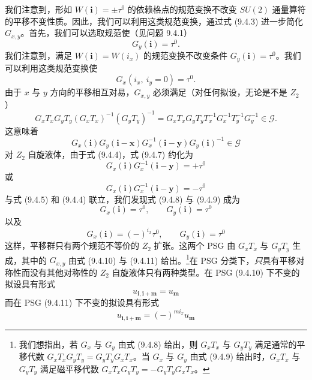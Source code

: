 我们注意到，形如 $W(\pmb{i})=\pm\tau^0$ 的依赖格点的规范变换不改变 $SU(2)$ 通量算符的平移不变性质。因此，我们可以利用这类规范变换，通过式 (9.4.3) 进一步简化 $G_{x,y}$。首先，我们可以选取规范使（见问题 9.4.1）
\begin{equation*}
G_y(\pmb{i})=\tau^0.
\tag{9.4.4}
\end{equation*}
我们注意到，满足 $W(\pmb{i})=W(i_x)$ 的规范变换不改变条件 $G_y(\pmb{i})=\tau^0$。我们可以利用这类规范变换使
\begin{equation*}
G_x(i_x,\ i_y=0)=\tau^0.
\tag{9.4.5}
\end{equation*}
由于 $x$ 与 $y$ 方向的平移相互对易，$G_{x,y}$ 必须满足（对任何拟设，无论是不是 $Z_2$）
\begin{equation*}
G_xT_xG_yT_y(G_xT_x)^{-1}(G_yT_y)^{-1}=G_xT_xG_yT_yT_x^{-1}G_x^{-1}T_y^{-1}G_y^{-1}\in\mathcal{G}.
\tag{9.4.6}
\end{equation*}
这意味着
\begin{equation*}
G_x(\pmb{i})G_y(\pmb{i}-\pmb{x})G_x^{-1}(\pmb{i}-\pmb{y})G_y(\pmb{i})^{-1}\in\mathcal{G}
\tag{9.4.7}
\end{equation*}
对 $Z_2$ 自旋液体，由于式 (9.4.4)，式 (9.4.7) 约化为
\begin{equation*}
G_x(\pmb{i})G_x^{-1}(\pmb{i}-\pmb{y})=+\tau^0
\tag{9.4.8}
\end{equation*}
或
\begin{equation*}
G_x(\pmb{i})G_x^{-1}(\pmb{i}-\pmb{y})=-\tau^0
\tag{9.4.9}
\end{equation*}
与式 (9.4.5) 和 (9.4.4) 联立，我们发现式 (9.4.8) 与 (9.4.9) 成为
\begin{equation*}
G_x(\pmb{i})=\tau^0,\qquad G_y(\pmb{i})=\tau^0
\tag{9.4.10}
\end{equation*}
以及
\begin{equation*}
G_x(\pmb{i})=(-)^{i_x}\tau^0,\qquad G_y(\pmb{i})=\tau^0
\tag{9.4.11}
\end{equation*}
这样，平移群只有两个规范不等价的 $Z_2$ 扩张。这两个 PSG 由 $G_xT_x$ 与 $G_yT_y$ 生成，其中的 $G_{x,y}$ 由式 (9.4.10) 与 (9.4.11) 给出。\footnote{我们想指出，若 $G_x$ 与 $G_y$ 由式 (9.4.8) 给出，则 $G_xT_x$ 与 $G_yT_y$ 满足通常的平移代数 $G_xT_xG_yT_y=G_yT_yG_xT_x$。当 $G_x$ 与 $G_y$ 由式 (9.4.9) 给出时，$G_xT_x$ 与 $G_yT_y$ 满足磁平移代数 $G_xT_xG_yT_y=-G_yT_yG_xT_x$。}在 PSG 分类下，\emph{只}具有平移对称性而没有其他对称性的 $Z_2$ 自旋液体只有两种类型。在 PSG (9.4.10) 下不变的拟设具有形式
\begin{equation*}
u_{\pmb{i},\pmb{i}+\pmb{m}}=u_{\pmb{m}}
\tag{9.4.12}
\end{equation*}
而在 PSG (9.4.11) 下不变的拟设具有形式
\begin{equation*}
u_{\pmb{i},\pmb{i}+\pmb{m}}=(-)^{m i_x}u_{\pmb{m}}
\tag{9.4.13}
\end{equation*}

